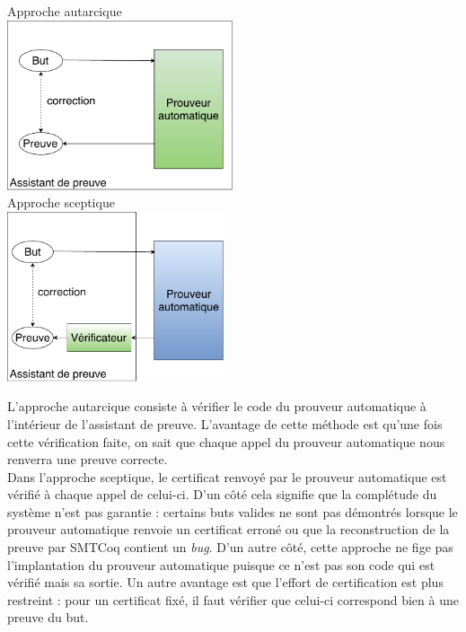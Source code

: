 \documentclass[11pt]{article}
\begin{document}
\begin{multicols}{2}
\begin{center}
Approche autarcique\\
\includegraphics[height=5cm]{1_Autarcique.pdf}\\
Approche sceptique\\
\includegraphics[height=5cm]{2_Sceptique.pdf}\\

\end{center}
\end{multicols}

L'approche autarcique consiste à vérifier le code du prouveur automatique à l'intérieur de l'assistant de preuve. L'avantage de cette méthode est qu'une fois cette vérification faite, on sait que chaque appel du prouveur automatique nous renverra une preuve correcte. \\

Dans l'approche sceptique, le certificat renvoyé par le prouveur automatique est vérifié à chaque appel de celui-ci. D'un côté cela signifie que la complétude du système n'est pas garantie : certains buts valides ne sont pas démontrés lorsque le prouveur automatique renvoie un certificat erroné ou que la reconstruction de la preuve par SMTCoq contient un \textit{bug}. D'un autre côté, cette approche ne fige pas l'implantation du prouveur automatique puisque ce n'est pas son code qui est vérifié mais sa sortie. Un autre avantage est que l'effort de certification est plus restreint : pour un certificat fixé, il faut vérifier que celui-ci correspond bien à une preuve du but.\\
\end{document}
